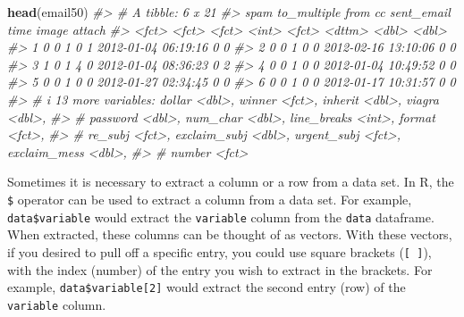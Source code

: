 \documentclass[
  10pt,
  openany]{book}
\newenvironment{Shaded}{\begin{snugshade}}{\end{snugshade}}
\newcommand{\CommentTok}[1]{\textcolor[rgb]{0.56,0.35,0.01}{\textit{#1}}}
\newcommand{\FunctionTok}[1]{\textcolor[rgb]{0.13,0.29,0.53}{\textbf{#1}}}
\newcommand{\NormalTok}[1]{#1}
\theoremstyle{definition}
\theoremstyle{definition}
\theoremstyle{definition}
\theoremstyle{definition}
\theoremstyle{remark}
\begin{document}
\begin{Shaded}
\begin{Highlighting}[]
\FunctionTok{head}\NormalTok{(email50) }
\CommentTok{\#\textgreater{} \# A tibble: 6 x 21}
\CommentTok{\#\textgreater{}   spam  to\_multiple from     cc sent\_email time                image attach}
\CommentTok{\#\textgreater{}   \textless{}fct\textgreater{} \textless{}fct\textgreater{}       \textless{}fct\textgreater{} \textless{}int\textgreater{} \textless{}fct\textgreater{}      \textless{}dttm\textgreater{}              \textless{}dbl\textgreater{}  \textless{}dbl\textgreater{}}
\CommentTok{\#\textgreater{} 1 0     0           1         0 1          2012{-}01{-}04 06:19:16     0      0}
\CommentTok{\#\textgreater{} 2 0     0           1         0 0          2012{-}02{-}16 13:10:06     0      0}
\CommentTok{\#\textgreater{} 3 1     0           1         4 0          2012{-}01{-}04 08:36:23     0      2}
\CommentTok{\#\textgreater{} 4 0     0           1         0 0          2012{-}01{-}04 10:49:52     0      0}
\CommentTok{\#\textgreater{} 5 0     0           1         0 0          2012{-}01{-}27 02:34:45     0      0}
\CommentTok{\#\textgreater{} 6 0     0           1         0 0          2012{-}01{-}17 10:31:57     0      0}
\CommentTok{\#\textgreater{} \# i 13 more variables: dollar \textless{}dbl\textgreater{}, winner \textless{}fct\textgreater{}, inherit \textless{}dbl\textgreater{}, viagra \textless{}dbl\textgreater{},}
\CommentTok{\#\textgreater{} \#   password \textless{}dbl\textgreater{}, num\_char \textless{}dbl\textgreater{}, line\_breaks \textless{}int\textgreater{}, format \textless{}fct\textgreater{},}
\CommentTok{\#\textgreater{} \#   re\_subj \textless{}fct\textgreater{}, exclaim\_subj \textless{}dbl\textgreater{}, urgent\_subj \textless{}fct\textgreater{}, exclaim\_mess \textless{}dbl\textgreater{},}
\CommentTok{\#\textgreater{} \#   number \textless{}fct\textgreater{}}
\end{Highlighting}
\end{Shaded}

Sometimes it is necessary to extract a column or a row from a data set.
In R, the \texttt{\$} operator can be used to extract a column from a data set.
For example, \texttt{data\$variable} would extract the \texttt{variable} column from the \texttt{data} dataframe.
When extracted, these columns can be thought of as vectors. With these vectors, if you desired to pull off a specific entry, you could use square brackets (\texttt{{[}\ {]}}), with the index (number) of the entry you wish to extract in the brackets.
For example, \texttt{data\$variable{[}2{]}} would extract the second entry (row) of the \texttt{variable} column.
\end{document}
